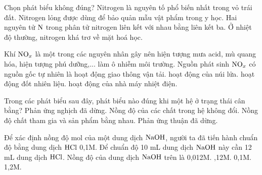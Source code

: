 \documentclass[11pt,a4paper]{article}
\begin{document}
\begin{ex}
Chọn phát biểu không đúng?
\choice
{\True Nitrogen là nguyên tố phổ biến nhất trong vỏ trái đất.}
{Nitrogen lỏng được dùng để bảo quản mẫu vật phẩm trong y học.}
{Hai nguyên tử $\ce{N}$ trong phân tử nitrogen liên kết với nhau bằng liên kết ba.}
{Ở nhiệt độ thường, nitrogen khá trơ về mặt hoá học.}

\end{ex}
\begin{ex}
Khí $\ce{NO_x}$ là một trong các nguyên nhân gây nên hiện tượng mưa acid, mù quang hóa, hiện tượng phú dưỡng,... làm ô nhiễm môi trường. Nguồn phát sinh $\ce{NO_x}$ có nguồn gốc tự nhiên là
\choice
{hoạt động giao thông vận tải.}
{\True hoạt động của núi lửa.}
{hoạt động đốt nhiên liệu.}
{hoạt động của nhà máy nhiệt điện.}

\end{ex}
\begin{ex}
Trong các phát biểu sau đây, phát biểu nào đúng khi một hệ ở trạng thái cân bằng?
\choice
{Phản ứng nghịch đã dừng.}
{\True Nồng độ của các chất trong hệ không đổi.}
{Nồng độ chất tham gia và sản phẩm bằng nhau.}
{Phản ứng thuận đã dừng.}

\end{ex}
\begin{ex}
Để xác định nồng độ mol của một dung dịch $\ce{NaOH}$, người ta đã tiến hành chuẩn độ bằng dung dịch $\ce{HCl}$ 0,1M. Để chuẩn độ 10 mL dung dịch $\ce{NaOH}$ này cần 12 mL dung dịch $\ce{HCl}$. Nồng độ của dung dịch $\ce{NaOH}$ trên là
\choice
{0,012M.}
{,12M.}
{0,1M.}
{1,2M.}

\end{ex}
\end{document}
